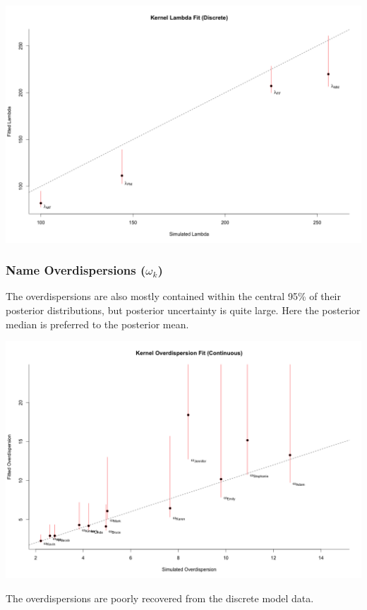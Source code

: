 \documentclass[12pt]{article}
\begin{document}
\includegraphics[scale = 0.37]{Estimates_Lambda_Discrete.png}

\pagebreak
\subsubsection*{Name Overdispersions ($\omega_k$)}
\noindent The overdispersions are also mostly contained within the central 95\% of their posterior distributions, but posterior uncertainty is quite large. Here the posterior median is preferred to the posterior mean.

\includegraphics[scale = 0.38]{Estimates_Omega_Continuous.png}

\noindent The overdispersions are poorly recovered from the discrete model data.
\end{document}
